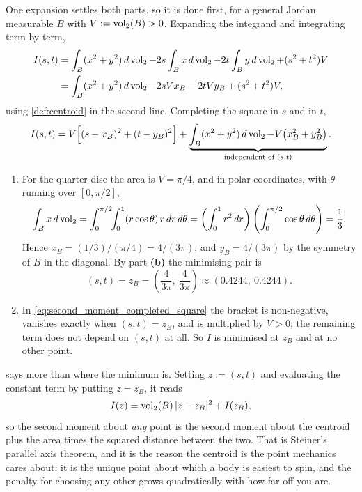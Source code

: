 \begin{exercisesolution}
\label{sol:centroid_minimises_second_moment}
One expansion settles both parts, so it is done first, for a general Jordan measurable $B$ with
$V := \operatorname{vol}_2(B) > 0$. Expanding the integrand and integrating term by term,
\begin{align*}
  I(s,t) &= \int_B (x^2+y^2)\,d\operatorname{vol}_2 - 2s\int_B x\,d\operatorname{vol}_2 - 2t\int_B y\,d\operatorname{vol}_2
    + (s^2+t^2)V \\
  &= \int_B (x^2+y^2)\,d\operatorname{vol}_2 - 2sVx_B - 2tVy_B + (s^2+t^2)V ,
\end{align*}
using \cref{def:centroid} in the second line. Completing the square in $s$ and in $t$,
\begin{equation}
\label{eq:second_moment_completed_square}
  I(s,t) = V\Big[(s-x_B)^2 + (t-y_B)^2\Big]
    + \underbrace{\int_B (x^2+y^2)\,d\operatorname{vol}_2 - V\big(x_B^2+y_B^2\big)}_{\text{independent of }(s,t)} .
\end{equation}

\begin{enumerate}[label=\textbf{(\alph*)}]
  \item For the quarter disc the area is $V = \pi/4$, and in polar coordinates, with $\theta$
    running over $[0,\pi/2]$,
    \[\int_B x \,d\operatorname{vol}_2 = \int_0^{\pi/2}\!\!\int_0^1 (r\cos\theta)\,r\,dr\,d\theta
      = \left(\int_0^1 r^2\,dr\right)\left(\int_0^{\pi/2}\cos\theta\,d\theta\right)
      = \frac13 .\]
    Hence $x_B = (1/3)/(\pi/4) = 4/(3\pi)$, and $y_B = 4/(3\pi)$ by the symmetry of $B$ in the
    diagonal. By part \textbf{(b)} the minimising pair is
    \[(s,t) = z_B = \left(\frac{4}{3\pi},\ \frac{4}{3\pi}\right) \approx (0.4244,\ 0.4244).\]
  \item In \eqref{eq:second_moment_completed_square} the bracket is non-negative, vanishes
    exactly when $(s,t) = z_B$, and is multiplied by $V > 0$; the remaining term does not depend
    on $(s,t)$ at all. So $I$ is minimised at $z_B$ and at no other point.
\end{enumerate}

\begin{remark}
 says more than where the minimum is. Setting
$z := (s,t)$ and evaluating the constant term by putting $z = z_B$, it reads
\[I(z) = \operatorname{vol}_2(B)\,\lvert z - z_B\rvert^2 + I(z_B),\]
so the second moment about \emph{any} point is the second moment about the centroid plus the
area times the squared distance between the two. That is Steiner's parallel axis theorem, and it
is the reason the centroid is the point mechanics cares about: it is the unique point about which
a body is easiest to spin, and the penalty for choosing any other grows quadratically with how
far off you are.
\end{remark}


\end{exercisesolution}
